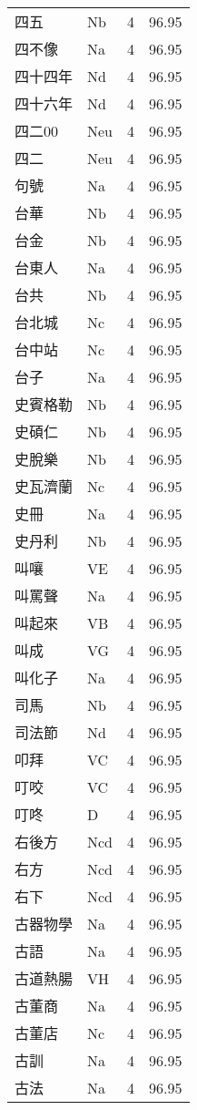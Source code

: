 \documentclass[twocolumn]{book}
\begin{document}
\begin{supertabular}{llrr}
四五 & Nb & 4 &  96.95\\
四不像 & Na & 4 &  96.95\\
四十四年 & Nd & 4 &  96.95\\
四十六年 & Nd & 4 &  96.95\\
四二00 & Neu & 4 &  96.95\\
四二 & Neu & 4 &  96.95\\
句號 & Na & 4 &  96.95\\
台華 & Nb & 4 &  96.95\\
台金 & Nb & 4 &  96.95\\
台東人 & Na & 4 &  96.95\\
台共 & Nb & 4 &  96.95\\
台北城 & Nc & 4 &  96.95\\
台中站 & Nc & 4 &  96.95\\
台子 & Na & 4 &  96.95\\
史賓格勒 & Nb & 4 &  96.95\\
史碩仁 & Nb & 4 &  96.95\\
史脫樂 & Nb & 4 &  96.95\\
史瓦濟蘭 & Nc & 4 &  96.95\\
史冊 & Na & 4 &  96.95\\
史丹利 & Nb & 4 &  96.95\\
叫嚷 & VE & 4 &  96.95\\
叫罵聲 & Na & 4 &  96.95\\
叫起來 & VB & 4 &  96.95\\
叫成 & VG & 4 &  96.95\\
叫化子 & Na & 4 &  96.95\\
司馬 & Nb & 4 &  96.95\\
司法節 & Nd & 4 &  96.95\\
叩拜 & VC & 4 &  96.95\\
叮咬 & VC & 4 &  96.95\\
叮咚 & D & 4 &  96.95\\
右後方 & Ncd & 4 &  96.95\\
右方 & Ncd & 4 &  96.95\\
右下 & Ncd & 4 &  96.95\\
古器物學 & Na & 4 &  96.95\\
古語 & Na & 4 &  96.95\\
古道熱腸 & VH & 4 &  96.95\\
古董商 & Na & 4 &  96.95\\
古董店 & Nc & 4 &  96.95\\
古訓 & Na & 4 &  96.95\\
古法 & Na & 4 &  96.95\\

\end{supertabular}
\end{document}
